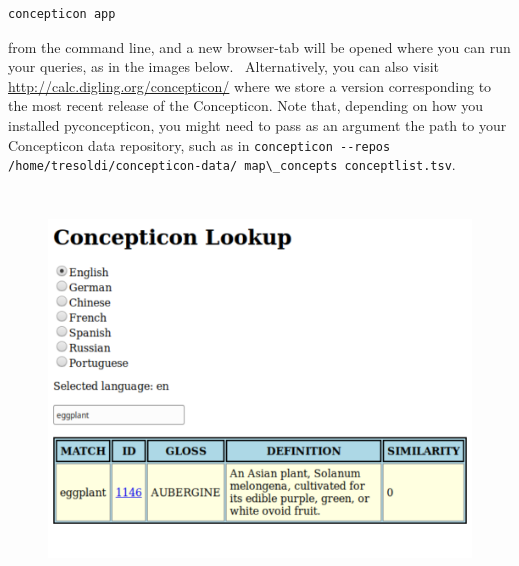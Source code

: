 \documentclass[
  a4paper,
  14pt,
  oneside,
  tablecaptionabove
]{scrbook}
\newcommand{\passthrough}[1]{#1}
\begin{document}
\begin{lstlisting}
concepticon app
\end{lstlisting}

from the command line, and a new browser-tab will be opened where you
can run your queries, as in the images below.~ Alternatively, you can
also visit \url{http://calc.digling.org/concepticon/} where we store a
version corresponding to the most recent release of the Concepticon.
Note that, depending on how you installed pyconcepticon, you might need
to pass as an argument the path to your Concepticon data repository,
such as in
\passthrough{\lstinline!concepticon --repos /home/tresoldi/concepticon-data/ map\_concepts conceptlist.tsv!}.


\begin{figure}[h!]
\centering
\includegraphics[width=5.20833in,height=4.15625in]{images/__f-origin.hypotheses.org_wp-content_blogs.dir_4500_files_2019_03_Screenshot_2019-03-26-Concepticon-Lookup-eggplant-500x399.png}
\end{figure}
\end{document}
